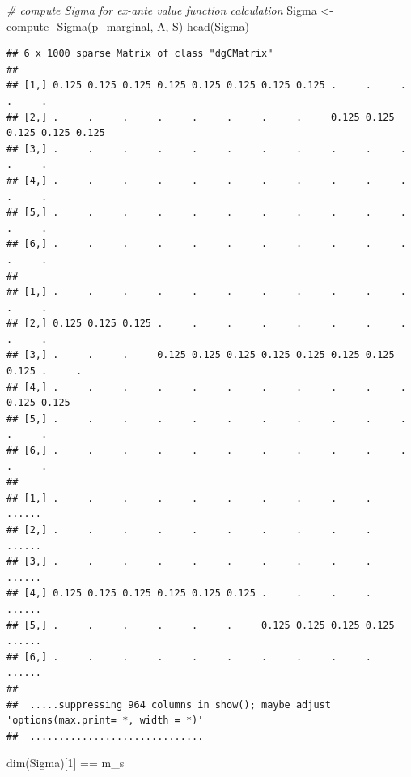 \documentclass[
]{book}
\newenvironment{Shaded}{\begin{snugshade}}{\end{snugshade}}
\newcommand{\CommentTok}[1]{\textcolor[rgb]{0.56,0.35,0.01}{\textit{#1}}}
\newcommand{\DecValTok}[1]{\textcolor[rgb]{0.00,0.00,0.81}{#1}}
\newcommand{\FunctionTok}[1]{\textcolor[rgb]{0.00,0.00,0.00}{#1}}
\newcommand{\NormalTok}[1]{#1}
\newcommand{\OtherTok}[1]{\textcolor[rgb]{0.56,0.35,0.01}{#1}}
\newcommand{\SpecialCharTok}[1]{\textcolor[rgb]{0.00,0.00,0.00}{#1}}
\begin{document}
\begin{Shaded}
\begin{Highlighting}[]
\CommentTok{\# compute Sigma for ex{-}ante value function calculation}
\NormalTok{Sigma }\OtherTok{\textless{}{-}} \FunctionTok{compute\_Sigma}\NormalTok{(p\_marginal, A, S)}
\FunctionTok{head}\NormalTok{(Sigma)}
\end{Highlighting}
\end{Shaded}

\begin{verbatim}
## 6 x 1000 sparse Matrix of class "dgCMatrix"
##                                                                                   
## [1,] 0.125 0.125 0.125 0.125 0.125 0.125 0.125 0.125 .     .     .     .     .    
## [2,] .     .     .     .     .     .     .     .     0.125 0.125 0.125 0.125 0.125
## [3,] .     .     .     .     .     .     .     .     .     .     .     .     .    
## [4,] .     .     .     .     .     .     .     .     .     .     .     .     .    
## [5,] .     .     .     .     .     .     .     .     .     .     .     .     .    
## [6,] .     .     .     .     .     .     .     .     .     .     .     .     .    
##                                                                                   
## [1,] .     .     .     .     .     .     .     .     .     .     .     .     .    
## [2,] 0.125 0.125 0.125 .     .     .     .     .     .     .     .     .     .    
## [3,] .     .     .     0.125 0.125 0.125 0.125 0.125 0.125 0.125 0.125 .     .    
## [4,] .     .     .     .     .     .     .     .     .     .     .     0.125 0.125
## [5,] .     .     .     .     .     .     .     .     .     .     .     .     .    
## [6,] .     .     .     .     .     .     .     .     .     .     .     .     .    
##                                                                        
## [1,] .     .     .     .     .     .     .     .     .     .     ......
## [2,] .     .     .     .     .     .     .     .     .     .     ......
## [3,] .     .     .     .     .     .     .     .     .     .     ......
## [4,] 0.125 0.125 0.125 0.125 0.125 0.125 .     .     .     .     ......
## [5,] .     .     .     .     .     .     0.125 0.125 0.125 0.125 ......
## [6,] .     .     .     .     .     .     .     .     .     .     ......
## 
##  .....suppressing 964 columns in show(); maybe adjust 'options(max.print= *, width = *)'
##  ..............................
\end{verbatim}

\begin{Shaded}
\begin{Highlighting}[]
\FunctionTok{dim}\NormalTok{(Sigma)[}\DecValTok{1}\NormalTok{] }\SpecialCharTok{==}\NormalTok{ m\_s}
\end{Highlighting}
\end{Shaded}
\end{document}
